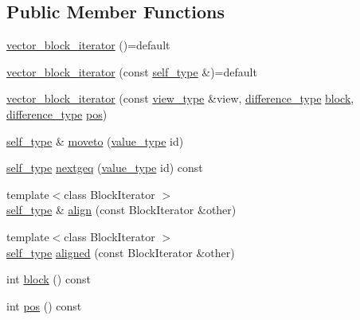 \subsection*{Public Member Functions}
\begin{DoxyCompactItemize}
\item 
\mbox{\hyperlink{classirk_1_1vector__block__iterator_a556c7d699e7aca9bd1980440cee98c4c}{vector\+\_\+block\+\_\+iterator}} ()=default
\item 
\mbox{\hyperlink{classirk_1_1vector__block__iterator_a675b570eae64be69dff0a58aa2e30491}{vector\+\_\+block\+\_\+iterator}} (const \mbox{\hyperlink{classirk_1_1vector__block__iterator_a39e5fae2a4258ea1a7cad14a66be2908}{self\+\_\+type}} \&)=default
\item 
\mbox{\hyperlink{classirk_1_1vector__block__iterator_a7e13b6d84896fcd0c31c090ddd634c45}{vector\+\_\+block\+\_\+iterator}} (const \mbox{\hyperlink{classirk_1_1vector__block__iterator_aab9b845032870211b56eddcfd9f8cadb}{view\+\_\+type}} \&view, \mbox{\hyperlink{classirk_1_1vector__block__iterator_adc4ee937499f8c9ea24a6f99401b4d22}{difference\+\_\+type}} \mbox{\hyperlink{classirk_1_1vector__block__iterator_a820d31edd98d2ecf75daa93efcebd06d}{block}}, \mbox{\hyperlink{classirk_1_1vector__block__iterator_adc4ee937499f8c9ea24a6f99401b4d22}{difference\+\_\+type}} \mbox{\hyperlink{classirk_1_1vector__block__iterator_a886fe6a7ba56c67ca63e0a62e756e1fb}{pos}})
\item 
\mbox{\hyperlink{classirk_1_1vector__block__iterator_a39e5fae2a4258ea1a7cad14a66be2908}{self\+\_\+type}} \& \mbox{\hyperlink{classirk_1_1vector__block__iterator_a698954af3be4c0e65b699141b9b8d0f7}{moveto}} (\mbox{\hyperlink{classirk_1_1vector__block__iterator_aaf15da7489a2eb86a95b4c309053e6de}{value\+\_\+type}} id)
\item 
\mbox{\hyperlink{classirk_1_1vector__block__iterator_a39e5fae2a4258ea1a7cad14a66be2908}{self\+\_\+type}} \mbox{\hyperlink{classirk_1_1vector__block__iterator_acc0471a7ee5d33c78fbbf15ab58e06dc}{nextgeq}} (\mbox{\hyperlink{classirk_1_1vector__block__iterator_aaf15da7489a2eb86a95b4c309053e6de}{value\+\_\+type}} id) const
\item 
{\footnotesize template$<$class Block\+Iterator $>$ }\\\mbox{\hyperlink{classirk_1_1vector__block__iterator_a39e5fae2a4258ea1a7cad14a66be2908}{self\+\_\+type}} \& \mbox{\hyperlink{classirk_1_1vector__block__iterator_a83fd5704ae4a6f65da799890cc203835}{align}} (const Block\+Iterator \&other)
\item 
{\footnotesize template$<$class Block\+Iterator $>$ }\\\mbox{\hyperlink{classirk_1_1vector__block__iterator_a39e5fae2a4258ea1a7cad14a66be2908}{self\+\_\+type}} \mbox{\hyperlink{classirk_1_1vector__block__iterator_af5332945a82553b1af770b7863c2769f}{aligned}} (const Block\+Iterator \&other)
\item 
int \mbox{\hyperlink{classirk_1_1vector__block__iterator_a820d31edd98d2ecf75daa93efcebd06d}{block}} () const
\item 
int \mbox{\hyperlink{classirk_1_1vector__block__iterator_a886fe6a7ba56c67ca63e0a62e756e1fb}{pos}} () const
\end{DoxyCompactItemize}
